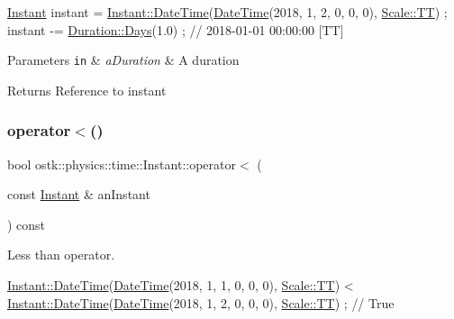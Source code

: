 \begin{DoxyCode}
\hyperlink{classostk_1_1physics_1_1time_1_1_instant_a132c1e4b2fe9a9a671109206e297bd5d}{Instant} instant = \hyperlink{classostk_1_1physics_1_1time_1_1_instant_afd5725574a02389b80fad4baff313c8a}{Instant::DateTime}(\hyperlink{classostk_1_1physics_1_1time_1_1_instant_afd5725574a02389b80fad4baff313c8a}{DateTime}(2018, 1, 2, 0, 0, 0), 
      \hyperlink{namespaceostk_1_1physics_1_1time_adf23d37bd8641fb76a0e98ab46a70df7adf1f3edb9115acb0a1e04209b7a9937b}{Scale::TT}) ;
instant -= \hyperlink{classostk_1_1physics_1_1time_1_1_duration_aefb4abc87c6957d00650228d069fa1e1}{Duration::Days}(1.0) ; \textcolor{comment}{// 2018-01-01 00:00:00 [TT]}
\end{DoxyCode}



\begin{DoxyParams}[1]{Parameters}
\mbox{\tt in}  & {\em a\+Duration} & A duration \\
\hline
\end{DoxyParams}
\begin{DoxyReturn}{Returns}
Reference to instant 
\end{DoxyReturn}
\mbox{\label{classostk_1_1physics_1_1time_1_1_instant_a17692f0ecb5ab2feecf153c0e1d9d2a4}} 
\subsubsection{\texorpdfstring{operator$<$()}{operator<()}}
{\footnotesize\ttfamily bool ostk\+::physics\+::time\+::\+Instant\+::operator$<$ (\begin{DoxyParamCaption}\item[{const \hyperlink{classostk_1_1physics_1_1time_1_1_instant}{Instant} \&}]{an\+Instant }\end{DoxyParamCaption}) const}



Less than operator. 


\begin{DoxyCode}
\hyperlink{classostk_1_1physics_1_1time_1_1_instant_afd5725574a02389b80fad4baff313c8a}{Instant::DateTime}(\hyperlink{classostk_1_1physics_1_1time_1_1_instant_afd5725574a02389b80fad4baff313c8a}{DateTime}(2018, 1, 1, 0, 0, 0), 
      \hyperlink{namespaceostk_1_1physics_1_1time_adf23d37bd8641fb76a0e98ab46a70df7adf1f3edb9115acb0a1e04209b7a9937b}{Scale::TT}) < \hyperlink{classostk_1_1physics_1_1time_1_1_instant_afd5725574a02389b80fad4baff313c8a}{Instant::DateTime}(\hyperlink{classostk_1_1physics_1_1time_1_1_instant_afd5725574a02389b80fad4baff313c8a}{DateTime}(2018, 1, 2, 0, 0, 0), 
      \hyperlink{namespaceostk_1_1physics_1_1time_adf23d37bd8641fb76a0e98ab46a70df7adf1f3edb9115acb0a1e04209b7a9937b}{Scale::TT}) ; \textcolor{comment}{// True}
\end{DoxyCode}




